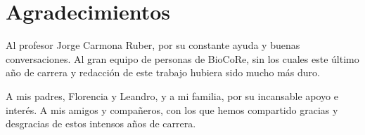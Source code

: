 \section*{Agradecimientos}
\label{sec:agradecimientos}

Al profesor Jorge Carmona Ruber, por su constante ayuda y buenas conversaciones.
Al gran equipo de personas de BioCoRe, sin los cuales este último año de carrera
y redacción de este trabajo hubiera sido mucho más duro.

A mis padres, Florencia y Leandro, y a mi familia, por su incansable apoyo e
interés. A mis amigos y compañeros, con los que hemos compartido gracias y
desgracias de estos intensos años de carrera.

